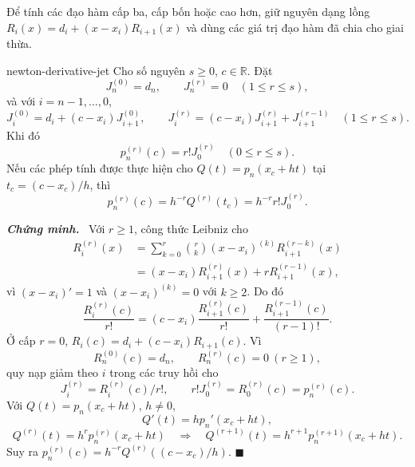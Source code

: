 \documentclass[12pt,a4paper,oneside]{book}
\numberwithin{algorithm}{chapter}
\theoremstyle{definition}
\newenvironment{chungminh}{\par\medskip\noindent\textbf{\textit{\color{mainblue}Chứng minh.}}\ }{\hfill$\blacksquare$\par\medskip}
\newcommand{\R}{\mathbb{R}}
\begin{document}
Để tính các đạo hàm cấp ba, cấp bốn hoặc cao hơn, giữ nguyên dạng lồng $R_i(x)=d_i+(x-x_i)R_{i+1}(x)$ và dùng các giá trị đạo hàm đã chia cho giai thừa.
\begin{menhde}{}{newton-derivative-jet}
Cho số nguyên $s\geq0$, $c\in\R$. Đặt
\[
 J_n^{(0)}=d_n,\qquad J_n^{(r)}=0\quad(1\leq r\leq s),
\]
và với $i=n-1,\ldots,0$,
\begin{equation}\label{eq:newton-derivative-jet}
 J_i^{(0)}=d_i+(c-x_i)J_{i+1}^{(0)},\qquad
 J_i^{(r)}=(c-x_i)J_{i+1}^{(r)}+J_{i+1}^{(r-1)}\quad(1\leq r\leq s).
\end{equation}
Khi đó
\[
 p_n^{(r)}(c)=r!J_0^{(r)}\quad(0\leq r\leq s).
\]
Nếu các phép tính được thực hiện cho $Q(t)=p_n(x_c+ht)$ tại $t_c=(c-x_c)/h$, thì
\begin{equation}\label{eq:newton-jet-scaling}
 p_n^{(r)}(c)=h^{-r}Q^{(r)}(t_c)=h^{-r}r!J_0^{(r)}.
\end{equation}
\end{menhde}
\begin{chungminh}
Với $r\geq1$, công thức Leibniz cho
\begin{align*}
 R_i^{(r)}(x)
 &=\sum_{k=0}^{r}\binom rk (x-x_i)^{(k)}R_{i+1}^{(r-k)}(x)\\
 &=(x-x_i)R_{i+1}^{(r)}(x)+rR_{i+1}^{(r-1)}(x),
\end{align*}
vì $(x-x_i)'=1$ và $(x-x_i)^{(k)}=0$ với $k\geq2$. Do đó
\[
 \frac{R_i^{(r)}(c)}{r!}
 =(c-x_i)\frac{R_{i+1}^{(r)}(c)}{r!}
 +\frac{R_{i+1}^{(r-1)}(c)}{(r-1)!}.
\]
Ở cấp $r=0$, $R_i(c)=d_i+(c-x_i)R_{i+1}(c)$. Vì
\[
 R_n^{(0)}(c)=d_n,\qquad R_n^{(r)}(c)=0\ (r\geq1),
\]
quy nạp giảm theo $i$ trong các truy hồi cho
\[
 J_i^{(r)}=R_i^{(r)}(c)/r!,\qquad
 r!J_0^{(r)}=R_0^{(r)}(c)=p_n^{(r)}(c).
\]
Với $Q(t)=p_n(x_c+ht)$, $h\ne0$,
\[
 Q'(t)=h p_n'(x_c+ht),
\]
\[
 Q^{(r)}(t)=h^rp_n^{(r)}(x_c+ht)
 \quad\Longrightarrow\quad
 Q^{(r+1)}(t)=h^{r+1}p_n^{(r+1)}(x_c+ht).
\]
Suy ra $p_n^{(r)}(c)=h^{-r}Q^{(r)}((c-x_c)/h)$.
\end{chungminh}
\end{document}
